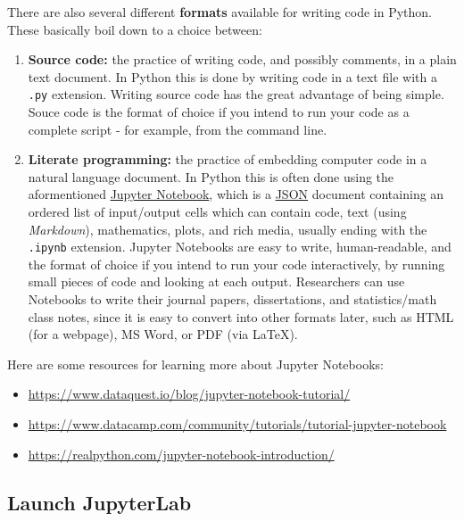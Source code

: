 \documentclass[
]{book}
\providecommand{\tightlist}{%
  \setlength{\itemsep}{0pt}\setlength{\parskip}{0pt}}
\begin{document}
There are also several different \textbf{formats} available for writing code in Python.
These basically boil down to a choice between:

\begin{enumerate}
\def\labelenumi{\arabic{enumi}.}
\item
  \textbf{Source code:} the practice of writing code, and possibly comments, in a plain text document. In Python this is done by writing code in a text file with a \texttt{.py} extension. Writing source code has the great advantage of being simple. Souce code is the format of choice if you intend to run your code as a complete script - for example, from the command line.
\item
  \textbf{Literate programming:} the practice of embedding computer code in a natural language document. In Python this is often done using the aformentioned \href{https://jupyter.org/}{Jupyter Notebook}, which is a \href{https://www.json.org/json-en.html}{JSON} document containing an ordered list of input/output cells which can contain code, text (using \emph{Markdown}), mathematics, plots, and rich media, usually ending with the \texttt{.ipynb} extension. Jupyter Notebooks are easy to write, human-readable, and the format of choice if you intend to run your code interactively, by running small pieces of code and looking at each output. Researchers can use Notebooks to write their journal papers, dissertations, and statistics/math class notes, since it is easy to convert into other formats later, such as HTML (for a webpage), MS Word, or PDF (via LaTeX).
\end{enumerate}

Here are some resources for learning more about Jupyter Notebooks:

\begin{itemize}
\tightlist
\item
  \url{https://www.dataquest.io/blog/jupyter-notebook-tutorial/}
\item
  \url{https://www.datacamp.com/community/tutorials/tutorial-jupyter-notebook}
\item
  \url{https://realpython.com/jupyter-notebook-introduction/}
\end{itemize}

\hypertarget{launch-jupyterlab-1}{%
\subsection{Launch JupyterLab}\label{launch-jupyterlab-1}}
\end{document}
